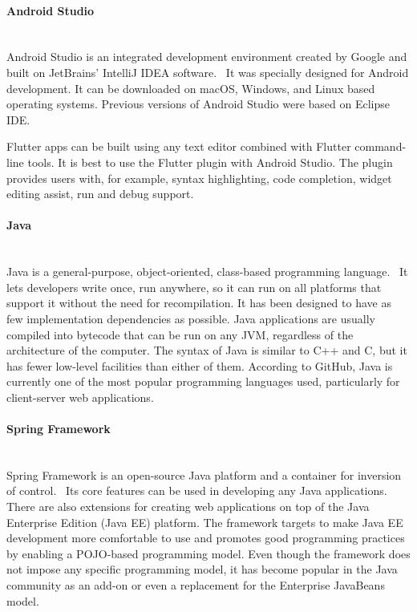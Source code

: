 \paragraph{\large{Android Studio}}\mbox{}\\[2pt]
Android Studio is an integrated development environment created by Google and built on JetBrains' IntelliJ IDEA software.~\cite{android-studio} It was specially designed for Android development. It can be downloaded on macOS, Windows, and Linux based operating systems. Previous versions of Android Studio were based on Eclipse IDE.

Flutter apps can be built using any text editor combined with Flutter command-line tools. It is best to use the Flutter plugin with Android Studio. The plugin provides users with, for example, syntax highlighting, code completion, widget editing assist, run and debug support.

\paragraph{\large{Java}}\mbox{}\\[2pt]
Java is a general-purpose, object-oriented, class-based programming language.~\cite{java} It lets developers write once, run anywhere, so it can run on all platforms that support it without the need for recompilation.  It has been designed to have as few implementation dependencies as possible. Java applications are usually compiled into bytecode that can be run on any JVM, regardless of the architecture of the computer. The syntax of Java is similar to C++ and C, but it has fewer low-level facilities than either of them. According to GitHub, Java is currently one of the most popular programming languages used, particularly for client-server web applications.~\cite{java-wiki}

\paragraph{\large{Spring Framework}}\mbox{}\\[2pt]
Spring Framework is an open-source Java platform and a container for inversion of control.~\cite{spring} Its core features can be used in developing any Java applications. There are also extensions for creating web applications on top of the Java Enterprise Edition (Java EE) platform. The framework targets to make Java EE development more comfortable to use and promotes good programming practices by enabling a POJO-based programming model. Even though the framework does not impose any specific programming model, it has become popular in the Java community as an add-on or even a replacement for the Enterprise JavaBeans model.

